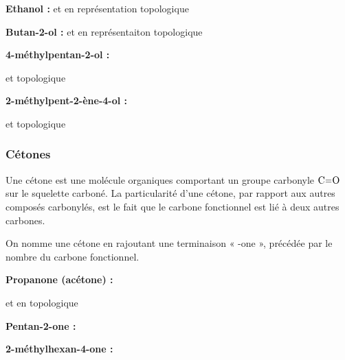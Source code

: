 \documentclass[11pt,a4paper]{article}
\begin{document}
\begin{eg}

\textbf{Ethanol : } 
 \quad \quad et en représentation topologique \quad  {}

\textbf{Butan-2-ol : }  \quad \quad et en représentaiton topologique \quad  {}
\vspace{1cm}

\textbf{4-méthylpentan-2-ol : }

 \quad \quad et topologique \quad {}
\vspace{1cm}

\textbf{ 2-méthylpent-2-ène-4-ol : }

  \quad \quad et topologique \quad {}
\end{eg}

\subsubsection*{Cétones}
Une cétone est une molécule organiques comportant un groupe carbonyle $\ce{C=O}$ sur le squelette carboné. La particularité d'une cétone, par rapport aux autres composés carbonylés, est le fait que le carbone fonctionnel est lié à deux autres carbones. 

On nomme une cétone en rajoutant une terminaison « -one », précédée par le nombre du carbone fonctionnel. 

\begin{eg}

\textbf{Propanone (acétone) : }

 \quad et en topologique

\textbf{Pentan-2-one : }
\vspace{2cm}

\textbf{2-méthylhexan-4-one : }
\vspace{2cm}

\end{eg}
\end{document}
